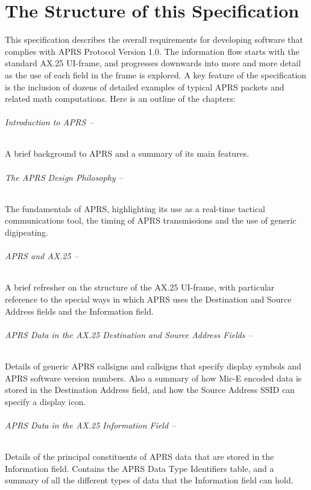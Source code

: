 \part{The Structure of this Specification}

This specification describes the overall requirements for developing software
that complies with APRS Protocol Version 1.0. The information flow starts
with the standard AX.25 UI-frame, and progresses downwards into more and
more detail as the use of each field in the frame is explored.
A key feature of the specification is the inclusion of dozens of detailed
examples of typical APRS packets and related math computations.
Here is an outline of the chapters:


\paragraph{Introduction to APRS --}A brief background to APRS and a summary of its
main features.

\paragraph{The APRS Design Philosophy --}The fundamentals of APRS, highlighting
its use as a real-time tactical communications tool, the timing of
APRS transmissions and the use of generic digipeating.

\paragraph{APRS and AX.25 --}A brief refresher on the structure of the AX.25
UI-frame, with particular reference to the special ways in which APRS uses
the Destination and Source Address fields and the Information field.

\paragraph{APRS Data in the AX.25 Destination and Source Address Fields --}
Details of generic APRS callsigns and callsigns that specify display symbols
and APRS software version numbers. Also a summary of how Mic-E
encoded data is stored in the Destination Address field, and how the Source
Address SSID can specify a display icon.

\paragraph{APRS Data in the AX.25 Information Field --}Details of the principal
constituents of APRS data that are stored in the Information field. Contains
the APRS Data Type Identifiers table, and a summary of all the different
types of data that the Information field can hold.

